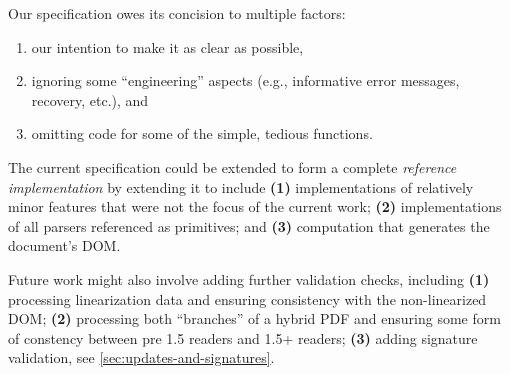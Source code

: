 Our specification owes its concision to multiple factors:
\begin{enumerate}
\item our intention to make it as clear as possible,
\item ignoring some ``engineering'' aspects (e.g., informative error
   messages, recovery, etc.), and
\item omitting code for some of the simple, tedious functions.
\end{enumerate}
The current specification could be extended to form a complete
\emph{reference implementation} by extending it to include
%
\textbf{(1)} implementations of relatively minor features that were
not the focus of the current work;
%
\textbf{(2)} implementations of all parsers referenced as primitives; and
%
\textbf{(3)} computation that generates the document's DOM.

Future work might also involve adding further validation checks,
including %
\textbf{(1)} processing linearization data and ensuring consistency
with the non-linearized DOM; %
\textbf{(2)} processing both ``branches'' of a hybrid PDF and ensuring
some form of constency between pre 1.5 readers and 1.5+ readers; %
\textbf{(3)} adding signature validation, see
\cref{sec:updates-and-signatures}.
